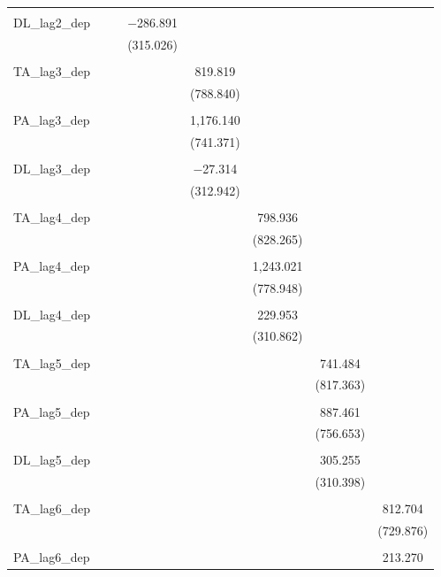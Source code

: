 \begin{table}[!htbp]
\begin{tabular}{@{\extracolsep{5pt}}lccccccc}
  & & & & & & & \\ 
 DL\_lag2\_dep &  &  & $-$286.891 &  &  &  &  \\ 
  &  &  & (315.026) &  &  &  &  \\ 
  & & & & & & & \\ 
 TA\_lag3\_dep &  &  &  & 819.819 &  &  &  \\ 
  &  &  &  & (788.840) &  &  &  \\ 
  & & & & & & & \\ 
 PA\_lag3\_dep &  &  &  & 1,176.140 &  &  &  \\ 
  &  &  &  & (741.371) &  &  &  \\ 
  & & & & & & & \\ 
 DL\_lag3\_dep &  &  &  & $-$27.314 &  &  &  \\ 
  &  &  &  & (312.942) &  &  &  \\ 
  & & & & & & & \\ 
 TA\_lag4\_dep &  &  &  &  & 798.936 &  &  \\ 
  &  &  &  &  & (828.265) &  &  \\ 
  & & & & & & & \\ 
 PA\_lag4\_dep &  &  &  &  & 1,243.021 &  &  \\ 
  &  &  &  &  & (778.948) &  &  \\ 
  & & & & & & & \\ 
 DL\_lag4\_dep &  &  &  &  & 229.953 &  &  \\ 
  &  &  &  &  & (310.862) &  &  \\ 
  & & & & & & & \\ 
 TA\_lag5\_dep &  &  &  &  &  & 741.484 &  \\ 
  &  &  &  &  &  & (817.363) &  \\ 
  & & & & & & & \\ 
 PA\_lag5\_dep &  &  &  &  &  & 887.461 &  \\ 
  &  &  &  &  &  & (756.653) &  \\ 
  & & & & & & & \\ 
 DL\_lag5\_dep &  &  &  &  &  & 305.255 &  \\ 
  &  &  &  &  &  & (310.398) &  \\ 
  & & & & & & & \\ 
 TA\_lag6\_dep &  &  &  &  &  &  & 812.704 \\ 
  &  &  &  &  &  &  & (729.876) \\ 
  & & & & & & & \\ 
 PA\_lag6\_dep &  &  &  &  &  &  & 213.270 \\ 

\end{tabular}
\end{table}
